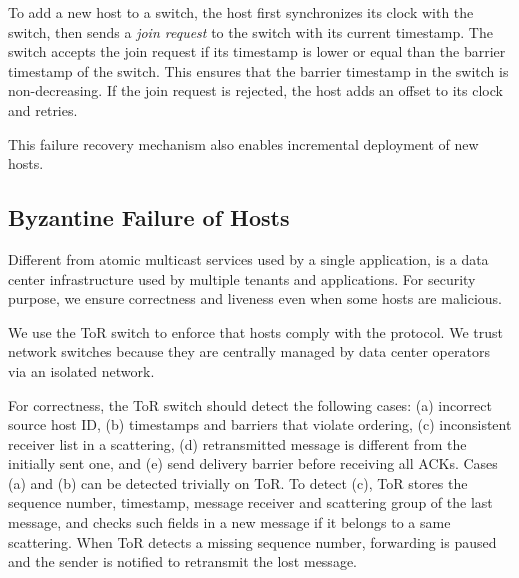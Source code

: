 {%

To add a new host to a switch, the host first synchronizes its clock with the switch, then sends a \emph{join request} to the switch with its current timestamp.
The switch accepts the join request if its timestamp is lower or equal than the barrier timestamp of the switch.
This ensures that the barrier timestamp in the switch is non-decreasing.
If the join request is rejected, the host adds an offset to its clock and retries.

This failure recovery mechanism also enables incremental deployment of new hosts.


\subsection{Byzantine Failure of Hosts}
\label{sec:byzantine}

Different from atomic multicast services used by a single application, \sys is a data center infrastructure used by multiple tenants and applications.
For security purpose, we ensure correctness and liveness even when some hosts are malicious.

We use the ToR switch to enforce that hosts comply with the \sys protocol.
We trust network switches because they are centrally managed by data center operators via an isolated network.

For correctness, the ToR switch should detect the following cases: (a) incorrect source host ID, (b) timestamps and barriers that violate ordering, (c) inconsistent receiver list in a scattering, (d) retransmitted message is different from the initially sent one, and (e) send delivery barrier before receiving all ACKs.
Cases (a) and (b) can be detected trivially on ToR.
To detect (c), ToR stores the sequence number, timestamp, message receiver and scattering group of the last message, and checks such fields in a new message if it belongs to a same scattering.
When ToR detects a missing sequence number, forwarding is paused and the sender is notified to retransmit the lost message.

}
